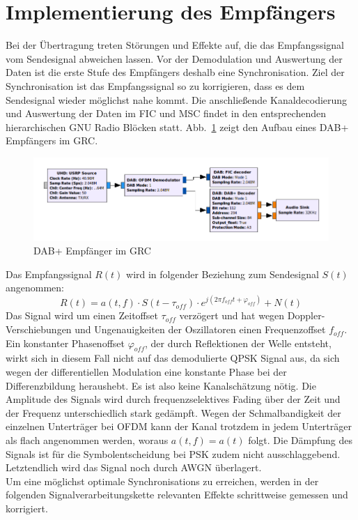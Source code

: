 \let\conjugatet\overline
\section{Implementierung des Empfängers}
\label{sec:impl_des_receivers}
Bei der Übertragung treten Störungen und Effekte auf, die das Empfangssignal vom Sendesignal abweichen lassen. Vor der Demodulation und Auswertung der Daten ist die erste Stufe des Empfängers deshalb eine Synchronisation. Ziel der Synchronisation ist das Empfangssignal so zu korrigieren, dass es dem Sendesignal wieder möglichst nahe kommt. Die anschließende Kanaldecodierung und Auswertung der Daten im FIC und MSC findet in den entsprechenden hierarchischen GNU Radio Blöcken statt. Abb.~\ref{fig:grc_receiver} zeigt den Aufbau eines DAB+ Empfängers im GRC.

\begin{figure}[h]
\centering
  \includegraphics[width=\textwidth]{figures/GRC_receiver.png}
	\caption{DAB+ Empfänger im GRC}
	\label{fig:grc_receiver}
\end{figure}

Das Empfangssignal $R(t)$ wird in folgender Beziehung zum Sendesignal $S(t)$ angenommen:
\begin{equation}
R(t) = a(t,f) \cdot S(t-\tau_{off}) \cdot e^{j(2 \pi f_{off} t + \varphi_{off})} + N(t)
\end{equation}
Das Signal wird um einen Zeitoffset $\tau_{off}$ verzögert und hat wegen Doppler-Verschiebungen und Ungenauigkeiten der Oszillatoren einen Frequenzoffset $f_{off}$. Ein konstanter Phasenoffset $\varphi_{off}$, der durch Reflektionen der Welle entsteht, wirkt sich in diesem Fall nicht auf das demodulierte QPSK Signal aus, da sich wegen der differentiellen Modulation eine konstante Phase bei der Differenzbildung heraushebt. Es ist also keine Kanalschätzung nötig. Die Amplitude des Signals wird durch frequenzselektives Fading über der Zeit und der Frequenz unterschiedlich stark gedämpft. Wegen der Schmalbandigkeit der einzelnen Unterträger bei OFDM kann der Kanal trotzdem in jedem Unterträger als flach angenommen werden, woraus $a(t,f)=a(t)$ folgt. Die Dämpfung des Signals ist für die Symbolentscheidung bei PSK zudem nicht ausschlaggebend. Letztendlich wird das Signal noch durch \ac{AWGN} überlagert.\\ 
Um eine möglichst optimale Synchronisations zu erreichen, werden in der folgenden Signalverarbeitungskette relevanten Effekte schrittweise gemessen und korrigiert.

